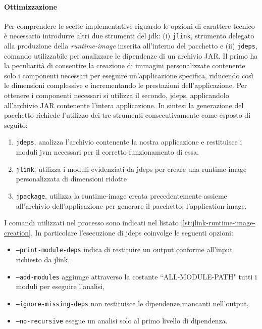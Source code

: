 \paragraph{Ottimizzazione} Per comprendere le scelte implementative riguardo le opzioni di carattere tecnico è necessario introdurre altri due strumenti del \ac{jdk}: (i) \texttt{jlink}, strumento delegato alla produzione della \textit{runtime-image} inserita all'interno del pacchetto e (ii) \texttt{jdeps}, comando utilizzabile per analizzare le dipendenze di un archivio JAR. Il primo ha la peculiarità di consentire la creazione di immagini personalizzate contenente solo i componenti necessari per eseguire un'applicazione specifica, riducendo così le dimensioni complessive e incrementando le prestazioni dell'applicazione. Per ottenere i componenti necessari si utilizza il secondo, jdeps, applicandolo all'archivio JAR contenente l'intera applicazione. In sintesi la generazione del pacchetto richiede l'utilizzo dei tre strumenti consecutivamente come esposto di seguito:
\begin{enumerate}
	\item \texttt{jdeps}, analizza l'archivio contenente la nostra applicazione e restituisce i moduli jvm necessari per il corretto funzionamento di essa.
	\item \texttt{jlink}, utilizza i moduli evidenziati da jdeps per creare una runtime-image personalizzata di dimensioni ridotte
	\item \texttt{jpackage}, utilizza la runtime-image creata precedentemente assieme all'ar\-chi\-vio dell'applicazione per generare il pacchetto: l'application-image.
\end{enumerate}



I comandi utilizzati nel processo sono indicati nel listato \ref{lst:jlink-runtime-image-creation}. In particolare l'esecuzione di jdeps coinvolge le seguenti opzioni:
\begin{itemize}
	\item \texttt{--print-module-deps} indica di restituire un output conforme all'input ri\-chie\-sto da jlink,
	\item \texttt{--add-modules} aggiunge attraverso la costante ``ALL-MODULE-PATH" tutti i moduli per eseguire l'analisi,
	\item \texttt{--ignore-missing-deps} non restituisce le dipendenze mancanti nell'output,
	\item \texttt{--no-recursive} esegue un analisi solo al primo livello di dipendenza.
\end{itemize}

